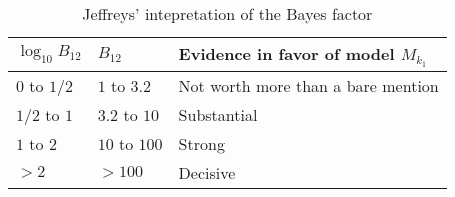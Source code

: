 \begin{table}
  \caption{Jeffreys' intepretation of the Bayes factor}
  \label{tab:bayes factor log10 scale}
  \begin{tabu}{X[1l]X[1l]X[5l]}
    \toprule
    $\log_{10} B_{12}$ & $B_{12}$ & Evidence in favor of model $M_{k_1}$ \\
    \midrule
    $0$ to $1/2$ & $1$ to $3.2$  & Not worth more than a bare mention \\
    $1/2$ to $1$ & $3.2$ to $10$ & Substantial \\
    $1$ to $2$   & $10$ to $100$ & Strong \\
    $>2$         & $>100$        & Decisive \\
    \bottomrule
  \end{tabu}
\end{table}
